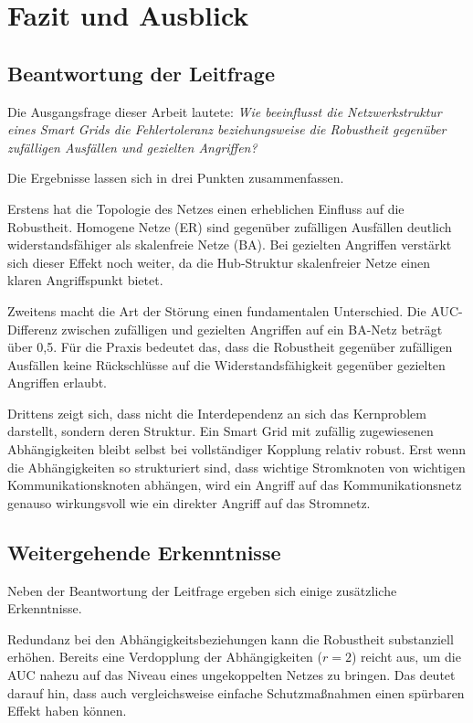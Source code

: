 \section{Fazit und Ausblick}
\label{sec:fazit}

\subsection{Beantwortung der Leitfrage}

Die Ausgangsfrage dieser Arbeit lautete: \textit{Wie beeinflusst die Netzwerkstruktur eines Smart Grids die Fehlertoleranz beziehungsweise die Robustheit gegenüber zufälligen Ausfällen und gezielten Angriffen?}

Die Ergebnisse lassen sich in drei Punkten zusammenfassen.

Erstens hat die Topologie des Netzes einen erheblichen Einfluss auf die Robustheit. Homogene Netze (ER) sind gegenüber zufälligen Ausfällen deutlich widerstandsfähiger als skalenfreie Netze (BA). Bei gezielten Angriffen verstärkt sich dieser Effekt noch weiter, da die Hub-Struktur skalenfreier Netze einen klaren Angriffspunkt bietet.

Zweitens macht die Art der Störung einen fundamentalen Unterschied. Die AUC-Differenz zwischen zufälligen und gezielten Angriffen auf ein BA-Netz beträgt über 0,5. Für die Praxis bedeutet das, dass die Robustheit gegenüber zufälligen Ausfällen keine Rückschlüsse auf die Widerstandsfähigkeit gegenüber gezielten Angriffen erlaubt.

Drittens zeigt sich, dass nicht die Interdependenz an sich das Kernproblem darstellt, sondern deren Struktur. Ein Smart Grid mit zufällig zugewiesenen Abhängigkeiten bleibt selbst bei vollständiger Kopplung relativ robust. Erst wenn die Abhängigkeiten so strukturiert sind, dass wichtige Stromknoten von wichtigen Kommunikationsknoten abhängen, wird ein Angriff auf das Kommunikationsnetz genauso wirkungsvoll wie ein direkter Angriff auf das Stromnetz.

\subsection{Weitergehende Erkenntnisse}

Neben der Beantwortung der Leitfrage ergeben sich einige zusätzliche Erkenntnisse.

Redundanz bei den Abhängigkeitsbeziehungen kann die Robustheit substanziell erhöhen. Bereits eine Verdopplung der Abhängigkeiten ($r = 2$) reicht aus, um die AUC nahezu auf das Niveau eines ungekoppelten Netzes zu bringen. Das deutet darauf hin, dass auch vergleichsweise einfache Schutzmaßnahmen einen spürbaren Effekt haben können.

